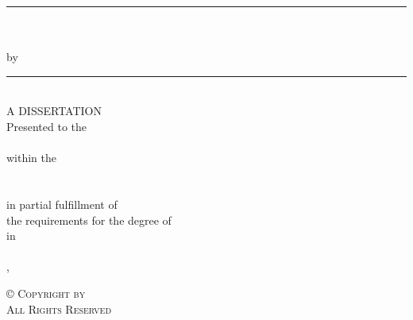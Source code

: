 \vspace*{\fill}
\begin{center}
\doublespaced
\rule{16cm}{1pt}\\
\MakeUppercase{\projecttitle{}} \\ 
by \projectauthor{} \\
\rule{16cm}{1pt}\\
\singlespaced
\vspace{20pt}
A DISSERTATION\\\vspace{30pt}
Presented to the\\\vspace{10pt}
\department{}\\\vspace{10pt}
within the \\\vspace{10pt}
\institution{}\\\vspace{10pt}
\school{}\\\vspace{10pt}
in partial fulfillment of\\\vspace{10pt}
the requirements for the degree of\\\vspace{10pt}
\degreelong{}  in\\\vspace{10pt}
\track{}\\\vspace{10pt}
\vspace{30pt}
\completionmonth{}, \completionyear{}\\
\end{center}
\vspace*{\fill}
\clearpage

\vspace*{\fill}
\begin{center}
\doublespaced
\scshape \copyright \hspace{3pt} Copyright \completionyear{} by \projectauthor{}\\
All Rights Reserved
\end{center}
\vspace*{\fill}
\clearpage

